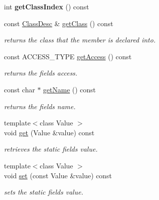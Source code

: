 \begin{DoxyCompactItemize}
\item 
int {\bfseries get\+Class\+Index} () const \hypertarget{classagm_1_1reflection_1_1_static_field_desc_a593a8689e1559e2449ca306c9e716a1d}{}\label{classagm_1_1reflection_1_1_static_field_desc_a593a8689e1559e2449ca306c9e716a1d}

\item 
const \hyperlink{classagm_1_1reflection_1_1_class_desc}{Class\+Desc} \& \hyperlink{classagm_1_1reflection_1_1_static_field_desc_a76f7ce9711fd0a964d3803376e612963}{get\+Class} () const 
\begin{DoxyCompactList}\small\item\em returns the class that the member is declared into. \end{DoxyCompactList}\item 
const A\+C\+C\+E\+S\+S\+\_\+\+T\+Y\+PE \hyperlink{classagm_1_1reflection_1_1_static_field_desc_a17debe9467d8b733f2f40f072befa928}{get\+Access} () const 
\begin{DoxyCompactList}\small\item\em returns the field\textquotesingle{}s access. \end{DoxyCompactList}\item 
const char $\ast$ \hyperlink{classagm_1_1reflection_1_1_static_field_desc_adf43ab9884bbceed1bb3482dadc57a63}{get\+Name} () const 
\begin{DoxyCompactList}\small\item\em returns the field\textquotesingle{}s name. \end{DoxyCompactList}\item 
{\footnotesize template$<$class Value $>$ }\\void \hyperlink{classagm_1_1reflection_1_1_static_field_desc_a112ff2d61e27d9d8af0a7e3ea221ccd4}{get} (Value \&value) const 
\begin{DoxyCompactList}\small\item\em retrieves the static field\textquotesingle{}s value. \end{DoxyCompactList}\item 
{\footnotesize template$<$class Value $>$ }\\void \hyperlink{classagm_1_1reflection_1_1_static_field_desc_a2a94af846f64986bd3283612b03faa7b}{set} (const Value \&value) const 
\begin{DoxyCompactList}\small\item\em sets the static field\textquotesingle{}s value. \end{DoxyCompactList}\end{DoxyCompactItemize}
